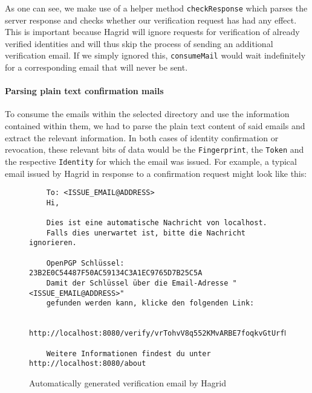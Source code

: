 As one can see, we make use of a helper method \texttt{checkResponse} which parses the server response and checks whether our verification request has had any effect. This is important because Hagrid will ignore requests for verification of already verified identities and will thus skip the process of sending an additional verification email. If we simply ignored this, \texttt{consumeMail} would wait indefinitely for a corresponding email that will never be sent. 

\paragraph{Parsing plain text confirmation mails}
To consume the emails within the selected directory and use the information contained within them, we had to parse the plain text content of said emails and extract the relevant information. In both cases of identity confirmation or revocation, these relevant bits of data would be the \texttt{Fingerprint}, the \texttt{Token} and the respective \texttt{Identity} for which the email was issued. For example, a typical email issued by Hagrid in response to a confirmation request might look like this: 
\begin{figure}[H]
    \begin{verbatim}
    To: <ISSUE_EMAIL@ADDRESS> 
    Hi,
    
    Dies ist eine automatische Nachricht von localhost.
    Falls dies unerwartet ist, bitte die Nachricht ignorieren.

    OpenPGP Schlüssel: 23B2E0C54487F50AC59134C3A1EC9765D7B25C5A 
    Damit der Schlüssel über die Email-Adresse "<ISSUE_EMAIL@ADDRESS>" 
    gefunden werden kann, klicke den folgenden Link:
    
    http://localhost:8080/verify/vrTohvV8q552KMvARBE7foqkvGtUrfDl3iiyX9yqeOX 
    
    Weitere Informationen findest du unter http://localhost:8080/about
    \end{verbatim}
    \caption{Automatically generated verification email by Hagrid}
\end{figure}


